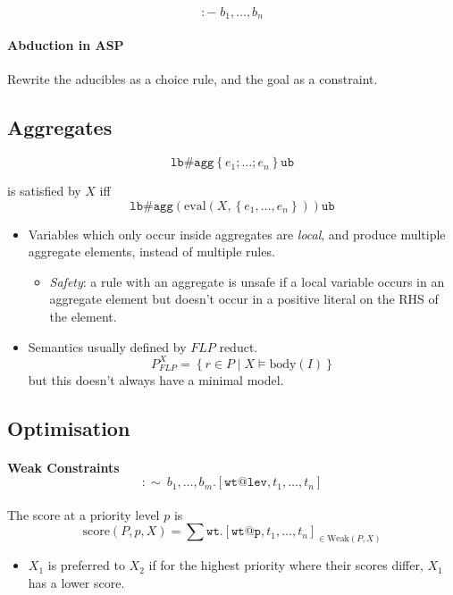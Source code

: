 \documentclass[twocolumn,english]{article}
\begin{document}
\[
:-\;b_{1},\dots,b_{n}
\]

\paragraph{Abduction in ASP}

Rewrite the aducibles as a choice rule, and the goal as a constraint.

\subsection{Aggregates}

\[
\mathtt{lb\#agg}\left\{ e_{1};\dots;e_{n}\right\} \mathtt{ub}
\]

is satisfied by $X$ iff
\[
\mathtt{lb\#agg}\left(\mathrm{eval}\left(X,\left\{ e_{1},\dots,e_{n}\right\} \right)\right)\mathtt{ub}
\]
\begin{itemize}
\item Variables which only occur inside aggregates are \emph{local}, and
produce multiple aggregate elements, instead of multiple rules.
\begin{itemize}
\item \emph{Safety}: a rule with an aggregate is unsafe if a local variable
occurs in an aggregate element but doesn't occur in a positive literal
on the RHS of the element.
\end{itemize}
\item Semantics usually defined by $FLP$ reduct.
\[
P_{FLP}^{X}=\left\{ r\in P\mid X\vDash\text{body}\left(I\right)\right\} 
\]
but this doesn't always have a minimal model.
\end{itemize}

\subsection{Optimisation}

\paragraph{Weak Constraints
\[
:\sim\:b_{1},\dots,b_{m}.\left[\mathtt{wt@lev},t_{1},\dots,t_{n}\right]
\]
}

The score at a priority level $p$ is
\[
\text{score}\left(P,p,X\right)=\sum\mathtt{wt}.\left[\mathtt{wt@p},t_{1},\dots,t_{n}\right]_{\in\text{Weak}\left(P,X\right)}
\]
\begin{itemize}
\item $X_{1}$ is preferred to $X_{2}$ if for the highest priority where
their scores differ, $X_{1}$ has a lower score.
\end{itemize}
\end{document}
